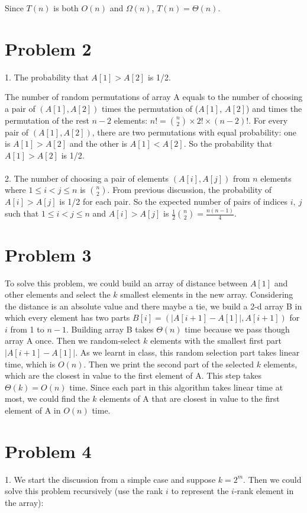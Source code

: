 \documentclass[twoside,11pt]{homework}
\begin{document}
Since $T(n)$ is both $O(n)$ and $\Omega(n)$, $T(n) = \Theta(n)$.


\section*{Problem 2}
1.
The probability that $A[1] > A[2]$ is 1/2.

The number of random permutations of array A equals to the number of choosing a pair of $(A[1], A[2])$ times the permutation of  ($A[1]$,  $A[2]$) and times the permutation of the rest $n-2$ elements:
$n! = {n\choose2} \times 2! \times (n-2)!$.
For every pair of $(A[1], A[2])$, there are two permutations with equal probability:
one is $A[1] > A[2]$ and the other is $A[1] < A[2]$.
So the probability that $A[1] > A[2]$ is 1/2.
\\\\
2.
The number of choosing a pair of elements $(A[i], A[j])$ from $n$ elements where $1 \le i < j \le n$ is $n\choose2$.
From previous discussion, the probability of $A[i] > A[j]$ is 1/2 for each pair.
So the expected number of pairs of indices $i,\ j$ such that $1 \le i < j \le n$ and $A[i] > A[j]$ is $\frac{1}{2} {n\choose2} = \frac{n(n-1)}{4}$.

\section*{Problem 3}
To solve this problem, we could build an array of distance between $A[1]$ and other elements and select the $k$ smallest elements in the new array.
Considering the distance is an absolute value and there maybe a tie, we build a 2-d array B in which every element has two parts $B[i] = (|A[i+1] - A[1]|, A[i+1])$ for $i$ from 1 to $n-1$.
Building array B takes $\Theta(n)$ time because we pass though array A once.
Then we random-select $k$ elements with the smallest first part $|A[i+1] - A[1]|$.
As we learnt in class, this random selection part takes linear time, which is $O(n)$.
Then we print the second part of the selected $k$ elements, which are the closest in value to the first element of A.
This step takes $\Theta(k) = O(n)$ time.
Since each part in this algorithm takes linear time at most, we could find the $k$ elements of A that are closest in value to the first element of A in $O(n)$ time.


\section*{Problem 4}
1. We start the discussion from a simple case and suppose $k = 2^m$.
Then we could solve this problem recursively (use the rank $i$ to represent the $i$-rank element in the array):
\end{document}
